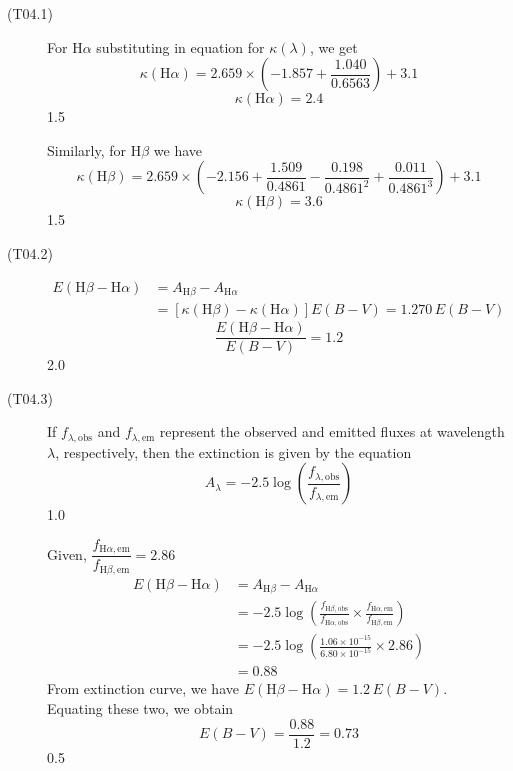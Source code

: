 \begin{description}
\item[(T04.1)] For H$\alpha$ substituting in equation for $\kappa(\lambda)$,
  we get
  \[ \kappa(\mathrm{H}\alpha)
     = 2.659\times\left(-1.857+\frac{1.040}{0.6563}\right) + 3.1 \]
  \[ \boxed{\kappa(\mathrm{H}\alpha) = 2.4} \]
  \hfill 1.5

  Similarly, for H$\beta$ we have
  \[ \kappa(\mathrm{H}\beta)
     = 2.659\times\left(-2.156+\frac{1.509}{0.4861}
       -\frac{0.198}{0.4861^2}+\frac{0.011}{0.4861^3}\right) + 3.1 \]
  \[ \boxed{\kappa(\mathrm{H}\beta) = 3.6} \]
  \hfill 1.5
\item[(T04.2)]
  \begin{align*}
  E(\mathrm{H}\beta-\mathrm{H}\alpha)
    &= A_{\mathrm{H}\beta} - A_{\mathrm{H}\alpha}
    \tag*{2.0}\\
    &= \left[\kappa(\mathrm{H}\beta)-\kappa(\mathrm{H}\alpha)\right]
       E(B-V) = 1.270\,E(B-V)
  \end{align*}
  \[ \boxed{\frac{E(\mathrm{H}\beta-\mathrm{H}\alpha)}{E(B-V)} = 1.2} \]
  \hfill 2.0
\item[(T04.3)] If $f_{\lambda,\mathrm{obs}}$ and $f_{\lambda,\mathrm{em}}$
  represent the observed and emitted fluxes at wavelength $\lambda$,
  respectively, then the extinction is given by the equation
  \[ A_\lambda = -2.5\log
     \left(\frac{f_{\lambda,\mathrm{obs}}}{f_{\lambda,\mathrm{em}}}\right) \]
  \hfill 1.0

  Given, $\dfrac{f_{\mathrm{H}\alpha,\mathrm{em}}}
    {f_{\mathrm{H}\beta,\mathrm{em}}} = 2.86$
  \begin{align*}
  E(\mathrm{H}\beta-\mathrm{H}\alpha)
    &= A_{\mathrm{H}\beta} - A_{\mathrm{H}\alpha}\\
    &= -2.5\log\left(
       \frac{f_{\mathrm{H}\beta,\mathrm{obs}}}
            {f_{\mathrm{H}\alpha,\mathrm{obs}}}\times
       \frac{f_{\mathrm{H}\alpha,\mathrm{em}}}
            {f_{\mathrm{H}\beta,\mathrm{em}}}\right)\\
    &= -2.5\log\left(\frac{1.06\times10^{-15}}{6.80\times10^{-15}}
       \times2.86\right)\\
    &= 0.88
    \tag*{1.5}
  \end{align*}
  From extinction curve, we have
  $E(\mathrm{H}\beta-\mathrm{H}\alpha) = 1.2\,E(B-V)$.\\
  Equating these two, we obtain
  \[ E(B-V) = \frac{0.88}{1.2} = 0.73 \]
  \hfill 0.5


\end{description}
